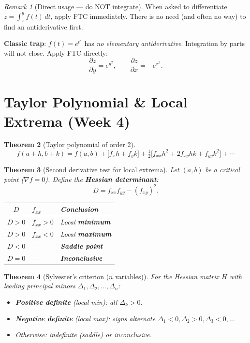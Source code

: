 \documentclass[12pt,a4paper]{article}
\newtheorem{theorem}{Theorem}[section]
\theoremstyle{definition}
\theoremstyle{remark}
\newtheorem{remark}[theorem]{Remark}
\newcommand{\grad}{\nabla}
\newcommand{\pd}[2]{\dfrac{\partial #1}{\partial #2}}
\begin{document}
\begin{remark}[Direct usage --- do NOT integrate]
When asked to differentiate $z = \int_x^y f(t)\,dt$, apply FTC immediately.
There is no need (and often no way) to find an antiderivative first.

\textbf{Classic trap}: $f(t) = e^{t^2}$ has \emph{no elementary antiderivative}.
Integration by parts will not close.  Apply FTC directly:
\[
  \pd{z}{y} = e^{y^2}, \qquad \pd{z}{x} = -e^{x^2}.
\]
\end{remark}

\section{Taylor Polynomial \& Local Extrema (Week 4)}

\begin{theorem}[Taylor polynomial of order 2]
\[
  f(a+h,b+k) = f(a,b) + \bigl[f_x h + f_y k\bigr]
  + \tfrac{1}{2}\bigl[f_{xx}h^2 + 2f_{xy}hk + f_{yy}k^2\bigr] + \cdots
\]
\end{theorem}

\begin{theorem}[Second derivative test for local extrema]
Let $(a,b)$ be a critical point ($\grad f=0$). Define the \textbf{Hessian determinant}:
\[
  D = f_{xx}f_{yy} - (f_{xy})^2.
\]
\begin{center}
\begin{tabular}{cll}
\toprule
$D$ & $f_{xx}$ & Conclusion \\
\midrule
$D>0$ & $f_{xx}>0$ & Local \textbf{minimum} \\
$D>0$ & $f_{xx}<0$ & Local \textbf{maximum} \\
$D<0$ & --- & \textbf{Saddle point} \\
$D=0$ & --- & \textbf{Inconclusive} \\
\bottomrule
\end{tabular}
\end{center}
\end{theorem}

\begin{theorem}[Sylvester's criterion ($n$ variables)]
For the Hessian matrix $H$ with leading principal minors $\Delta_1,\Delta_2,\dots,\Delta_n$:
\begin{itemize}
  \item \textbf{Positive definite} (local min): all $\Delta_k>0$.
  \item \textbf{Negative definite} (local max): signs alternate $\Delta_1<0,\Delta_2>0,\Delta_3<0,\dots$
  \item Otherwise: indefinite (saddle) or inconclusive.
\end{itemize}
\end{theorem}
\end{document}
